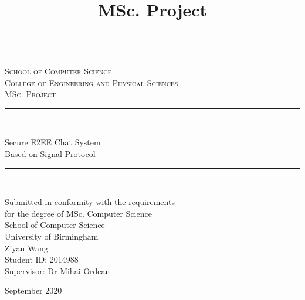 \documentclass[twoside,12pt,a4paper]{article}
\title{MSc. Project\\\bhamthesistitle}
\author{\textsf{\bhamstudentname}}
\date{}
\newcommand{\bhamstudentname}{Ziyan Wang}
\newcommand{\bhamfronttitle}{Secure E2EE Chat System\\Based on Signal Protocol}
\newcommand{\bhamschool}{School of Computer Science}
\newcommand{\bhamcollege}{Engineering and Physical Sciences}
\newcommand{\bhamdegree}{MSc. Computer Science}
\newcommand{\bhamid}{2014988}
\newcommand{\bhamsupervisor}{Dr Mihai Ordean}
\newcommand{\bhamyear}{2020}
\newcommand{\HRule}{\rule{\linewidth}{0.5mm}}
\begin{document}
\begin{titlepage}
\begin{center}
\begin{minipage}{6in}
  \centering
  \hspace*{.2in}
  \end{minipage}
  \\ [1.0cm]
\textsc{{\LARGE \bhamschool\\}College of \bhamcollege}\\[3.5cm]

\textsc{\Large MSc. Project}\\[0.5cm]

\HRule \\[0.4cm]
\begin{center}\Huge
\bhamfronttitle
\end{center}
\HRule \\[1.5cm]

\begin{center}
Submitted in conformity with the requirements\\ for the degree of \bhamdegree\\
\bhamschool\\ University of Birmingham\\
\vspace{2cm}
\bhamstudentname\\
Student ID: \bhamid\\
Supervisor: \bhamsupervisor      
\end{center}
\vfill

{\large September \bhamyear}

\end{center}
\end{titlepage}
\clearpage
\end{document}
